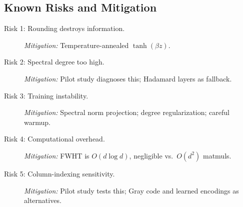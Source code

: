 \documentclass[12pt,a4paper]{article}
\theoremstyle{plain}
\theoremstyle{definition}
\theoremstyle{remark}
\begin{document}
\subsection{Known Risks and Mitigation}\label{sec:risks}

\begin{description}
    \item[Risk 1: Rounding destroys information.] \emph{Mitigation:} Temperature-annealed $\tanh(\beta z)$.
    \item[Risk 2: Spectral degree too high.] \emph{Mitigation:} Pilot study diagnoses this; Hadamard layers as fallback.
    \item[Risk 3: Training instability.] \emph{Mitigation:} Spectral norm projection; degree regularization; careful warmup.
    \item[Risk 4: Computational overhead.] \emph{Mitigation:} FWHT is $O(d \log d)$, negligible vs.\ $O(d^2)$ matmuls.
    \item[Risk 5: Column-indexing sensitivity.] \emph{Mitigation:} Pilot study tests this; Gray code and learned encodings as alternatives.
\end{description}


\newpage


\end{document}
